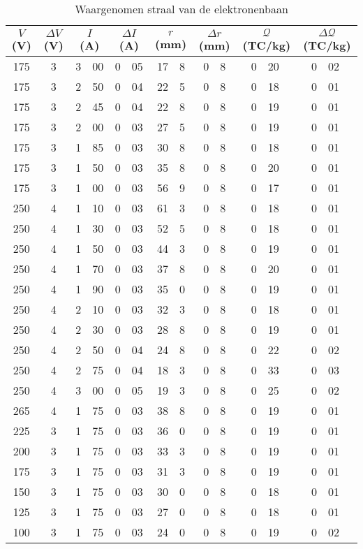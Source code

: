 \begin{table}
\caption{Waargenomen straal van de elektronenbaan}
\label{tabel-elektron}
\begin{center}
\begin{tabular}{c|c||r@{.}l|r@{.}l||r@{.}l|r@{.}l||r@{.}l|r@{.}l}
\multicolumn{1}{c|}{$V$ (V)}&
\multicolumn{1}{c||}{$\Delta V$ (V)}&
\multicolumn{2}{c|}{$I$ (A)}&
\multicolumn{2}{c||}{$\Delta I$ (A)}&
\multicolumn{2}{c|}{$r$ (mm)}&
\multicolumn{2}{c||}{$\Delta r$ (mm)}&
\multicolumn{2}{c|}{$\mathcal{Q}$ (TC/kg)}&
\multicolumn{2}{c}{$\Delta \mathcal{Q}$ (TC/kg)}\\\hline
175&	3&	3&00&	0&05&	17&8&	0&8&	0&20&	0&02\\
175&	3&	2&50&	0&04&	22&5&	0&8&	0&18&	0&01\\
175&	3&	2&45&	0&04&	22&8&	0&8&	0&19&	0&01\\
175&	3&	2&00&	0&03&	27&5&	0&8&	0&19&	0&01\\
175&	3&	1&85&	0&03&	30&8&	0&8&	0&18&	0&01\\
175&	3&	1&50&	0&03&	35&8&	0&8&	0&20&	0&01\\
175&	3&	1&00&	0&03&	56&9&	0&8&	0&17&	0&01\\\hline
250&	4&	1&10&	0&03&	61&3&	0&8&	0&18&	0&01\\
250&	4&	1&30&	0&03&	52&5&	0&8&	0&18&	0&01\\
250&	4&	1&50&	0&03&	44&3&	0&8&	0&19&	0&01\\
250&	4&	1&70&	0&03&	37&8&	0&8&	0&20&	0&01\\
250&	4&	1&90&	0&03&	35&0&	0&8&	0&19&	0&01\\
250&	4&	2&10&	0&03&	32&3&	0&8&	0&18&	0&01\\
250&	4&	2&30&	0&03&	28&8&	0&8&	0&19&	0&01\\
250&	4&	2&50&	0&04&	24&8&	0&8&	0&22&	0&02\\
250&	4&	2&75&	0&04&	18&3&	0&8&	0&33&	0&03\\
250&	4&	3&00&	0&05&	19&3&	0&8&	0&25&	0&02\\\hline
265&	4&	1&75&	0&03&	38&8&	0&8&	0&19&	0&01\\
225&	3&	1&75&	0&03&	36&0&	0&8&	0&19&	0&01\\
200&	3&	1&75&	0&03&	33&3&	0&8&	0&19&	0&01\\
175&	3&	1&75&	0&03&	31&3&	0&8&	0&19&	0&01\\
150&	3&	1&75&	0&03&	30&0&	0&8&	0&18&	0&01\\
125&	3&	1&75&	0&03&	27&0&	0&8&	0&18&	0&01\\
100&	3&	1&75&	0&03&	24&0&	0&8&	0&19&	0&02\\\hline

\end{tabular}
\end{center}
\end{table}
